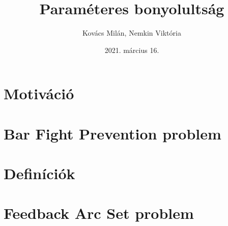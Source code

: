 \documentclass[aspectratio=169]{beamer}
\begin{document}
\title{Paraméteres bonyolultság}
\author{Kovács Milán, Nemkin Viktória}
\date{2021. március 16.}


\frame{\titlepage}


\section{Motiváció}






\section{Bar Fight Prevention problem}










\section{Definíciók}



\section{Feedback Arc Set problem}





\end{document}
